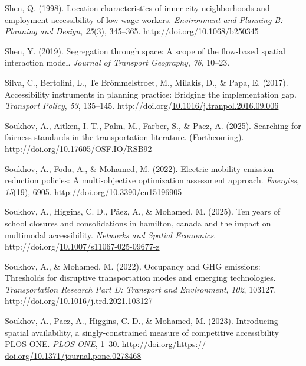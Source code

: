 \documentclass[
11pt, %
oneside, %
english, %
singlespacing, %
]{macthesis} %
\newlength{\cslhangindent}
\newenvironment{CSLReferences}[2] %
{\begin{list}{}{%
	\setlength{\itemindent}{0pt}
	\setlength{\leftmargin}{0pt}
	\setlength{\parsep}{0pt}
	\ifodd #1
	\setlength{\leftmargin}{\cslhangindent}
	\setlength{\itemindent}{-1\cslhangindent}
	\fi
	\setlength{\itemsep}{#2\baselineskip}}}
{\end{list}}
\begin{document}
\begin{CSLReferences}{1}{0}
Shen, Q. (1998). Location characteristics of inner-city neighborhoods and employment accessibility of low-wage workers. \emph{Environment and Planning B: Planning and Design}, \emph{25}(3), 345--365. http://doi.org/\href{https://doi.org/10.1068/b250345}{10.1068/b250345}

Shen, Y. (2019). Segregation through space: A scope of the flow-based spatial interaction model. \emph{Journal of Transport Geography}, \emph{76}, 10--23.

Silva, C., Bertolini, L., Te Brömmelstroet, M., Milakis, D., \& Papa, E. (2017). Accessibility instruments in planning practice: Bridging the implementation gap. \emph{Transport Policy}, \emph{53}, 135--145. http://doi.org/\href{https://doi.org/10.1016/j.tranpol.2016.09.006}{10.1016/j.tranpol.2016.09.006}

Soukhov, A., Aitken, I. T., Palm, M., Farber, S., \& Paez, A. (2025). Searching for fairness standards in the transportation literature. (Forthcoming). http://doi.org/\href{https://doi.org/10.17605/OSF.IO/RSB92}{10.17605/OSF.IO/RSB92}

Soukhov, A., Foda, A., \& Mohamed, M. (2022). Electric mobility emission reduction policies: A multi-objective optimization assessment approach. \emph{Energies}, \emph{15}(19), 6905. http://doi.org/\href{https://doi.org/10.3390/en15196905}{10.3390/en15196905}

Soukhov, A., Higgins, C. D., Páez, A., \& Mohamed, M. (2025). Ten years of school closures and consolidations in hamilton, canada and the impact on multimodal accessibility. \emph{Networks and Spatial Economics}. http://doi.org/\href{https://doi.org/10.1007/s11067-025-09677-z}{10.1007/s11067-025-09677-z}

Soukhov, A., \& Mohamed, M. (2022). Occupancy and {GHG} emissions: Thresholds for disruptive transportation modes and emerging technologies. \emph{Transportation Research Part D: Transport and Environment}, \emph{102}, 103127. http://doi.org/\href{https://doi.org/10.1016/j.trd.2021.103127}{10.1016/j.trd.2021.103127}

Soukhov, A., Paez, A., Higgins, C. D., \& Mohamed, M. (2023). Introducing spatial availability, a singly-constrained measure of competitive accessibility {\textbar} {PLOS} {ONE}. \emph{{PLOS} {ONE}}, 1--30. http://doi.org/\href{https://\%20doi.org/10.1371/journal.pone.0278468}{https:// doi.org/10.1371/journal.pone.0278468}


\end{CSLReferences}
\end{document}
